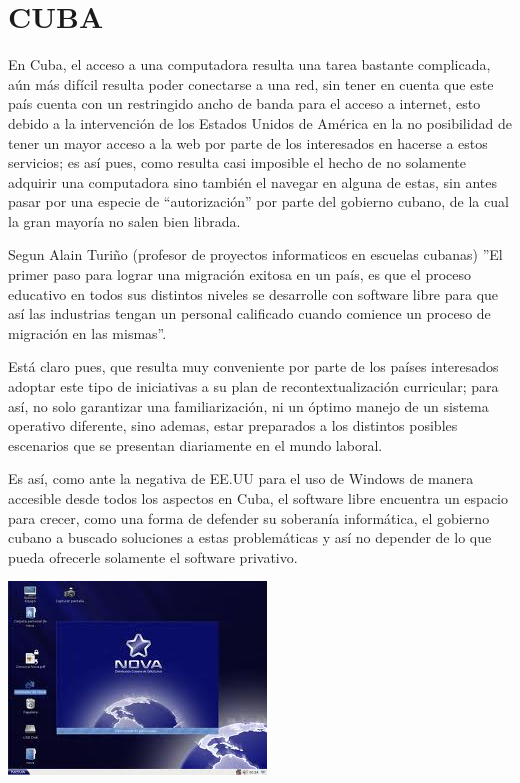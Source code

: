 \section*{CUBA}
En Cuba, el acceso a una computadora resulta una tarea bastante complicada, aún más difícil resulta poder conectarse a una red, sin tener en cuenta que este país cuenta con 
un restringido ancho de banda para el acceso a internet, esto debido a la intervención de los Estados Unidos de América en la no posibilidad de tener un mayor acceso a la 
web por parte de los interesados en hacerse a estos servicios; es así pues, como resulta casi imposible el hecho de no solamente adquirir una computadora sino también el 
navegar en alguna de estas, sin antes pasar por una especie de “autorización” por parte del gobierno cubano, de la cual la gran mayoría no salen bien librada. 

Segun Alain Turiño (profesor de proyectos informaticos en escuelas cubanas) ”El primer paso para lograr una migración exitosa en un país, es que el proceso educativo en 
todos sus distintos niveles se desarrolle con software libre para que así las industrias tengan un personal calificado cuando comience un proceso de migración en las 
mismas”.

Está claro pues, que resulta muy conveniente por parte de los países interesados adoptar este tipo de iniciativas a su plan de recontextualización curricular; para así, no 
solo garantizar una familiarización, ni un óptimo manejo de un sistema operativo diferente, sino ademas, estar preparados a los distintos posibles escenarios que se 
presentan diariamente en el mundo laboral.

Es así, como ante la negativa de EE.UU para el uso de Windows de manera accesible desde todos los aspectos en Cuba, el software libre encuentra un espacio para crecer, como 
una forma de defender su soberanía informática, el gobierno cubano a buscado soluciones a estas problemáticas y así no depender de lo que pueda ofrecerle solamente el 
software privativo. 

\includegraphics[scale=1]{img/cp03/img0302.png}

